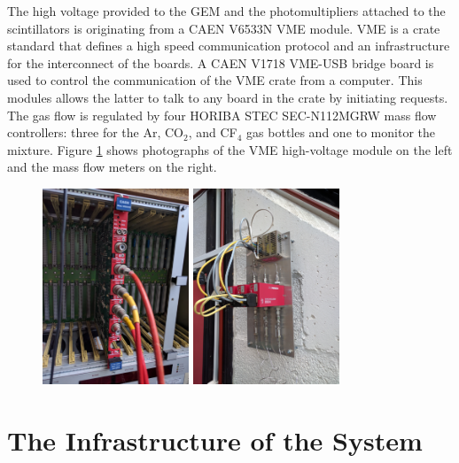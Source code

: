     The high voltage provided to the GEM and the photomultipliers attached to the scintillators is originating from a CAEN V6533N VME module. VME is a crate standard that defines a high speed communication protocol and an infrastructure for the interconnect of the boards. A CAEN V1718 VME-USB bridge board is used to control the communication of the VME crate from a computer. This modules allows the latter to talk to any board in the crate by initiating requests. The gas flow is regulated by four HORIBA STEC SEC-N112MGRW mass flow controllers: three for the Ar, CO$_2$, and CF$_4$ gas bottles and one to monitor the mixture. Figure \ref{fig:III-1-gas-hv} shows photographs of the VME high-voltage module on the left and the mass flow meters on the right.

    \begin{figure}[h!]
      \centering
      \includegraphics[width=0.39\textwidth]{img/III-1-arch/hv.jpg}
      \includegraphics[width=0.39\textwidth]{img/III-1-arch/gas.jpg}
      \caption{}
      \label{fig:III-1-gas-hv}
    \end{figure}

  \section{The Infrastructure of the System}

